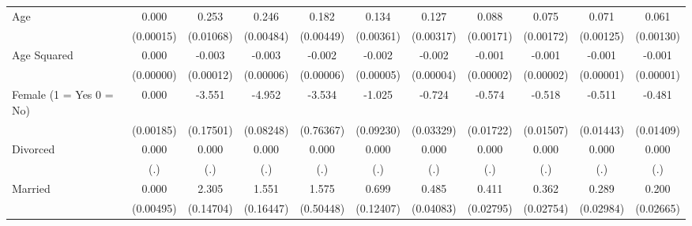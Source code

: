 {\begin{tabular}{l*{10}{c}}
Age                 &       0.000         &       0.253\sym{***}&       0.246\sym{***}&       0.182\sym{***}&       0.134\sym{***}&       0.127\sym{***}&       0.088\sym{***}&       0.075\sym{***}&       0.071\sym{***}&       0.061\sym{***}\\
                    &   (0.00015)         &   (0.01068)         &   (0.00484)         &   (0.00449)         &   (0.00361)         &   (0.00317)         &   (0.00171)         &   (0.00172)         &   (0.00125)         &   (0.00130)         \\
Age Squared         &       0.000         &      -0.003\sym{***}&      -0.003\sym{***}&      -0.002\sym{***}&      -0.002\sym{***}&      -0.002\sym{***}&      -0.001\sym{***}&      -0.001\sym{***}&      -0.001\sym{***}&      -0.001\sym{***}\\
                    &   (0.00000)         &   (0.00012)         &   (0.00006)         &   (0.00006)         &   (0.00005)         &   (0.00004)         &   (0.00002)         &   (0.00002)         &   (0.00001)         &   (0.00001)         \\
Female (1 = Yes 0 = No)&       0.000         &      -3.551\sym{***}&      -4.952\sym{***}&      -3.534\sym{***}&      -1.025\sym{***}&      -0.724\sym{***}&      -0.574\sym{***}&      -0.518\sym{***}&      -0.511\sym{***}&      -0.481\sym{***}\\
                    &   (0.00185)         &   (0.17501)         &   (0.08248)         &   (0.76367)         &   (0.09230)         &   (0.03329)         &   (0.01722)         &   (0.01507)         &   (0.01443)         &   (0.01409)         \\
Divorced            &       0.000         &       0.000         &       0.000         &       0.000         &       0.000         &       0.000         &       0.000         &       0.000         &       0.000         &       0.000         \\
                    &         (.)         &         (.)         &         (.)         &         (.)         &         (.)         &         (.)         &         (.)         &         (.)         &         (.)         &         (.)         \\
Married             &       0.000         &       2.305\sym{***}&       1.551\sym{***}&       1.575\sym{**} &       0.699\sym{***}&       0.485\sym{***}&       0.411\sym{***}&       0.362\sym{***}&       0.289\sym{***}&       0.200\sym{***}\\
                    &   (0.00495)         &   (0.14704)         &   (0.16447)         &   (0.50448)         &   (0.12407)         &   (0.04083)         &   (0.02795)         &   (0.02754)         &   (0.02984)         &   (0.02665)         \\

\end{tabular}}

